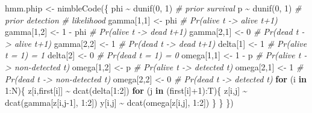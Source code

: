 \documentclass[
  12pt,
]{krantz}
\newenvironment{Shaded}{\begin{snugshade}}{\end{snugshade}}
\newcommand{\CommentTok}[1]{\textcolor[rgb]{0.56,0.35,0.01}{\textit{#1}}}
\newcommand{\ControlFlowTok}[1]{\textcolor[rgb]{0.13,0.29,0.53}{\textbf{#1}}}
\newcommand{\DecValTok}[1]{\textcolor[rgb]{0.00,0.00,0.81}{#1}}
\newcommand{\FunctionTok}[1]{\textcolor[rgb]{0.00,0.00,0.00}{#1}}
\newcommand{\NormalTok}[1]{#1}
\newcommand{\OtherTok}[1]{\textcolor[rgb]{0.56,0.35,0.01}{#1}}
\newcommand{\SpecialCharTok}[1]{\textcolor[rgb]{0.00,0.00,0.00}{#1}}
\begin{document}
\begin{Shaded}
\begin{Highlighting}[]
\NormalTok{hmm.phip }\OtherTok{\textless{}{-}} \FunctionTok{nimbleCode}\NormalTok{(\{}
\NormalTok{  phi }\SpecialCharTok{\textasciitilde{}} \FunctionTok{dunif}\NormalTok{(}\DecValTok{0}\NormalTok{, }\DecValTok{1}\NormalTok{) }\CommentTok{\# prior survival}
\NormalTok{  p }\SpecialCharTok{\textasciitilde{}} \FunctionTok{dunif}\NormalTok{(}\DecValTok{0}\NormalTok{, }\DecValTok{1}\NormalTok{) }\CommentTok{\# prior detection}
  \CommentTok{\# likelihood}
\NormalTok{  gamma[}\DecValTok{1}\NormalTok{,}\DecValTok{1}\NormalTok{] }\OtherTok{\textless{}{-}}\NormalTok{ phi      }\CommentTok{\# Pr(alive t {-}\textgreater{} alive t+1)}
\NormalTok{  gamma[}\DecValTok{1}\NormalTok{,}\DecValTok{2}\NormalTok{] }\OtherTok{\textless{}{-}} \DecValTok{1} \SpecialCharTok{{-}}\NormalTok{ phi  }\CommentTok{\# Pr(alive t {-}\textgreater{} dead t+1)}
\NormalTok{  gamma[}\DecValTok{2}\NormalTok{,}\DecValTok{1}\NormalTok{] }\OtherTok{\textless{}{-}} \DecValTok{0}        \CommentTok{\# Pr(dead t {-}\textgreater{} alive t+1)}
\NormalTok{  gamma[}\DecValTok{2}\NormalTok{,}\DecValTok{2}\NormalTok{] }\OtherTok{\textless{}{-}} \DecValTok{1}        \CommentTok{\# Pr(dead t {-}\textgreater{} dead t+1)}
\NormalTok{  delta[}\DecValTok{1}\NormalTok{] }\OtherTok{\textless{}{-}} \DecValTok{1}          \CommentTok{\# Pr(alive t = 1) = 1}
\NormalTok{  delta[}\DecValTok{2}\NormalTok{] }\OtherTok{\textless{}{-}} \DecValTok{0}          \CommentTok{\# Pr(dead t = 1) = 0}
\NormalTok{  omega[}\DecValTok{1}\NormalTok{,}\DecValTok{1}\NormalTok{] }\OtherTok{\textless{}{-}} \DecValTok{1} \SpecialCharTok{{-}}\NormalTok{ p    }\CommentTok{\# Pr(alive t {-}\textgreater{} non{-}detected t)}
\NormalTok{  omega[}\DecValTok{1}\NormalTok{,}\DecValTok{2}\NormalTok{] }\OtherTok{\textless{}{-}}\NormalTok{ p        }\CommentTok{\# Pr(alive t {-}\textgreater{} detected t)}
\NormalTok{  omega[}\DecValTok{2}\NormalTok{,}\DecValTok{1}\NormalTok{] }\OtherTok{\textless{}{-}} \DecValTok{1}        \CommentTok{\# Pr(dead t {-}\textgreater{} non{-}detected t)}
\NormalTok{  omega[}\DecValTok{2}\NormalTok{,}\DecValTok{2}\NormalTok{] }\OtherTok{\textless{}{-}} \DecValTok{0}        \CommentTok{\# Pr(dead t {-}\textgreater{} detected t)}
  \ControlFlowTok{for}\NormalTok{ (i }\ControlFlowTok{in} \DecValTok{1}\SpecialCharTok{:}\NormalTok{N)\{}
\NormalTok{    z[i,first[i]] }\SpecialCharTok{\textasciitilde{}} \FunctionTok{dcat}\NormalTok{(delta[}\DecValTok{1}\SpecialCharTok{:}\DecValTok{2}\NormalTok{])}
    \ControlFlowTok{for}\NormalTok{ (j }\ControlFlowTok{in}\NormalTok{ (first[i]}\SpecialCharTok{+}\DecValTok{1}\NormalTok{)}\SpecialCharTok{:}\NormalTok{T)\{}
\NormalTok{      z[i,j] }\SpecialCharTok{\textasciitilde{}} \FunctionTok{dcat}\NormalTok{(gamma[z[i,j}\DecValTok{{-}1}\NormalTok{], }\DecValTok{1}\SpecialCharTok{:}\DecValTok{2}\NormalTok{])}
\NormalTok{      y[i,j] }\SpecialCharTok{\textasciitilde{}} \FunctionTok{dcat}\NormalTok{(omega[z[i,j], }\DecValTok{1}\SpecialCharTok{:}\DecValTok{2}\NormalTok{])}
\NormalTok{    \}}
\NormalTok{  \}}
\NormalTok{\})}
\end{Highlighting}
\end{Shaded}
\end{document}

